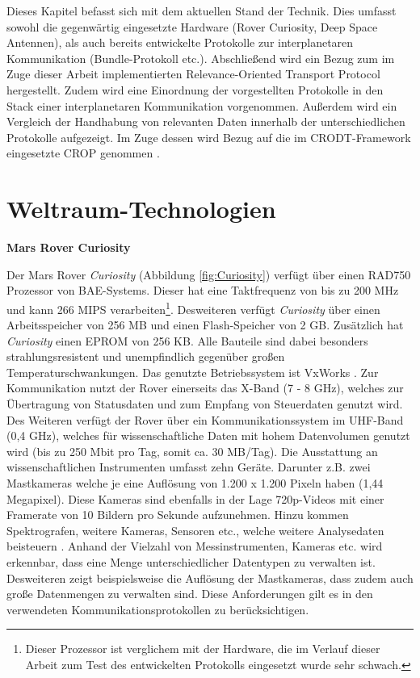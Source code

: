 \label{cap:standDerTechnik}
Dieses Kapitel befasst sich mit dem aktuellen Stand der Technik. Dies
umfasst sowohl die gegenw{\"a}rtig eingesetzte Hardware (Rover Curiosity, Deep
Space Antennen), als auch bereits entwickelte Protokolle zur interplanetaren
Kommunikation (Bundle-Protokoll etc.). Abschlie{\ss}end wird ein Bezug zum im
Zuge dieser Arbeit implementierten Relevance-Oriented Transport Protocol
hergestellt. Zudem wird eine Einordnung der vorgestellten Protokolle in
den Stack einer interplanetaren Kommunikation vorgenommen. Au{\ss}erdem wird ein
Vergleich der Handhabung von relevanten Daten innerhalb der unterschiedlichen
Protokolle aufgezeigt. Im Zuge dessen wird Bezug auf die im \gls{CRODT}-Framework
eingesetzte \gls{CROP} genommen \cite{Daher}.

\section{Weltraum-Technologien}

\textbf{Mars Rover Curiosity} \newline

Der Mars Rover \textit{Curiosity} (Abbildung \ref{fig:Curiosity}) verf{\"u}gt
{\"u}ber einen RAD750 Prozessor von BAE-Systems.
Dieser hat eine Taktfrequenz von bis zu 200 MHz und kann 266 MIPS
verarbeiten\footnote{Dieser Prozessor ist verglichem mit der Hardware, die im
Verlauf dieser Arbeit zum Test des entwickelten Protokolls eingesetzt wurde
sehr schwach.}. Desweiteren verf{\"u}gt \textit{Curiosity} {\"u}ber einen
Arbeitsspeicher von 256 MB und einen Flash-Speicher von 2 GB. Zus{\"a}tzlich
hat \textit{Curiosity} einen EPROM von 256 KB. Alle Bauteile sind dabei
besonders strahlungsresistent und unempfindlich gegen{\"u}ber gro{\ss}en
Temperaturschwankungen. Das genutzte Betriebssystem ist VxWorks \cite{WR}.
Zur Kommunikation nutzt der Rover einerseits das X-Band (7 - 8 GHz), welches zur
{\"U}bertragung von Statusdaten und zum Empfang von Steuerdaten genutzt wird.
Des Weiteren verf{\"u}gt der Rover {\"u}ber ein Kommunikationssystem im UHF-Band
(0,4 GHz), welches f{\"u}r wissenschaftliche Daten mit hohem Datenvolumen
genutzt wird (bis zu 250 Mbit pro Tag, somit ca. 30 MB/Tag).\newline 
Die Ausstattung an wissenschaftlichen Instrumenten umfasst zehn Ger{\"a}te.
Darunter z.B. zwei Mastkameras welche je eine Aufl{\"o}sung von 1.200 x 1.200
Pixeln haben (1,44 Megapixel). Diese Kameras sind ebenfalls in der Lage
720p-Videos mit einer Framerate von 10 Bildern pro Sekunde aufzunehmen. Hinzu
kommen Spektrografen, weitere Kameras, Sensoren etc., welche weitere
Analysedaten beisteuern \cite{web5}. Anhand der Vielzahl von Messinstrumenten,
Kameras etc. wird erkennbar, dass eine Menge unterschiedlicher Datentypen zu
verwalten ist.
Desweiteren zeigt beispielsweise die Aufl{\"o}sung der Mastkameras, dass zudem
auch gro{\ss}e Datenmengen zu verwalten sind. Diese Anforderungen gilt es in den
verwendeten Kommunikationsprotokollen zu ber{\"u}cksichtigen.

